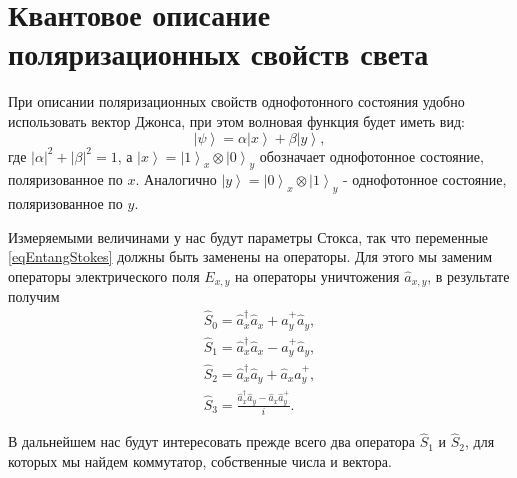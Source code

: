\section{Квантовое описание поляризационных свойств света}
При описании поляризационных свойств однофотонного состояния удобно
использовать вектор Джонса, при этом волновая функция будет иметь вид:
\begin{equation}
\left|\psi\right> = 
\alpha \left|x\right> + 
\beta \left|y\right>,
\label{eqEntangSimpleState}
\end{equation}
где $\left|\alpha\right|^2 + \left|\beta\right|^2 = 1$, а
$\left|x\right> = \left|1\right>_x\otimes\left|0\right>_y$ обозначает
однофотонное состояние, поляризованное по $x$. Аналогично 
$\left|y\right> = \left|0\right>_x\otimes\left|1\right>_y$ -
однофотонное состояние, поляризованное по $y$. 

Измеряемыми величинами у нас будут параметры Стокса, так что переменные
\eqref{eqEntangStokes} должны быть заменены на операторы. Для этого мы
заменим операторы электрического поля $E_{x,y}$ на операторы
уничтожения $\hat{a}_{x,y}$, в результате получим
\begin{eqnarray}
\hat{S}_0 = \hat{a}_x^{\dag} \hat{a}_x + \hat{a}_y^{+} \hat{a}_y,
\nonumber \\
\hat{S}_1 = \hat{a}_x^{\dag} \hat{a}_x - \hat{a}_y^{+} \hat{a}_y,
\nonumber \\
\hat{S}_2 = \hat{a}_x^{\dag} \hat{a}_y + \hat{a}_x \hat{a}_y^{+},
\nonumber \\
\hat{S}_3 = \frac{\hat{a}_x^{\dag} \hat{a}_y - \hat{a}_x \hat{a}_y^{+}}{i}.
\label{eqEntangStokesOper}
\end{eqnarray}

В дальнейшем нас будут интересовать прежде всего два оператора
$\hat{S}_1$ и $\hat{S}_2$, для которых мы найдем коммутатор,
собственные числа и вектора.

